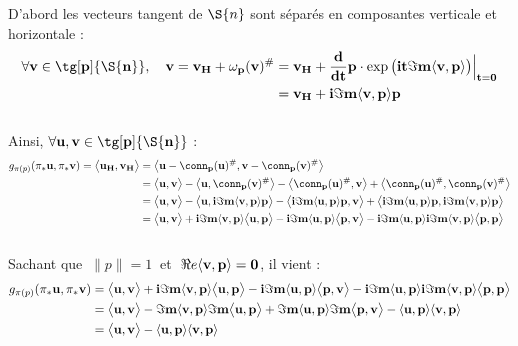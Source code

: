 D'abord les vecteurs tangent de $\S{n}$ sont séparés en composantes verticale et horizontale :
\begin{align}
	\forall \bf{v}\in \tg[p]{\S{n}},\quad \bf{v} = \bf{v}_H + \omega_p(\bf{v})^\# &= \bf{v}_H + \frac{d}{dt}p\cdot \exp\big(it\Im m \langle \bf{v}, p \rangle\big)\Big|_{t=0} \\
	&= \bf{v}_H  + i\Im m \langle \bf{v}, p \rangle p
\end{align}
\\
Ainsi, $\forall \bf{u},\bf{v}\in \tg[p]{\S{n}}$ :
\begin{align*}
	g_{\pi(p)}( \pi_*\bf{u}, \pi_*\bf{v}) = \big\langle \bf{u}_H, \bf{v}_H \big\rangle &= \big\langle\bf{u} - \conn_p(\bf{u})^\#, \bf{v} - \conn_p(\bf{v})^\# \big\rangle \\
	&= \big\langle\bf{u}, \bf{v} \big\rangle  - \big\langle\bf{u}, \conn_p(\bf{v})^\# \big\rangle - \big\langle \conn_p(\bf{u})^\#, \bf{v} \big\rangle + \big\langle \conn_p(\bf{u})^\#, \conn_p(\bf{v})^\# \big\rangle \\
	&= \big\langle\bf{u}, \bf{v} \big\rangle  - \big\langle\bf{u},  i\Im m \langle \bf{v}, p \rangle p \big\rangle - \big\langle  i\Im m \langle \bf{u}, p \rangle p, \bf{v} \big\rangle + \big\langle  i\Im m \langle \bf{u}, p \rangle p,  i\Im m \langle \bf{v}, p \rangle p \big\rangle \\
	&= \big\langle\bf{u}, \bf{v} \big\rangle  + i\Im m \langle \bf{v}, p \rangle\big\langle\bf{u}, p \big\rangle - i\Im m \langle \bf{u}, p \rangle\big\langle p, \bf{v} \big\rangle - i\Im m \langle \bf{u}, p \rangle i\Im m \langle \bf{v}, p \rangle \big\langle p, p \big\rangle
\end{align*}
\\
Sachant que $\ \|p\|=1\ $ et $\ \Re e \langle \bf{v},p\rangle = 0$, il vient :
\begin{align*}
	g_{\pi(p)}( \pi_*\bf{u}, \pi_*\bf{v}) 
	&= \big\langle\bf{u}, \bf{v} \big\rangle  + i\Im m \langle \bf{v}, p \rangle\big\langle\bf{u}, p \big\rangle - i\Im m \langle \bf{u}, p \rangle\big\langle p, \bf{v} \big\rangle - i\Im m \langle \bf{u}, p \rangle i\Im m \langle \bf{v}, p \rangle \big\langle p, p \big\rangle \\
	&= \big\langle\bf{u}, \bf{v} \big\rangle  -\Im m \langle \bf{v}, p \rangle \Im m\big\langle\bf{u}, p \big\rangle + \Im m \langle \bf{u}, p \rangle \Im m \big\langle p, \bf{v} \big\rangle - \langle \bf{u}, p \rangle \langle \bf{v}, p \rangle\\
	&= \big\langle\bf{u}, \bf{v} \big\rangle -  \langle \bf{u}, p \rangle \langle \bf{v}, p \rangle
\end{align*}
\\

